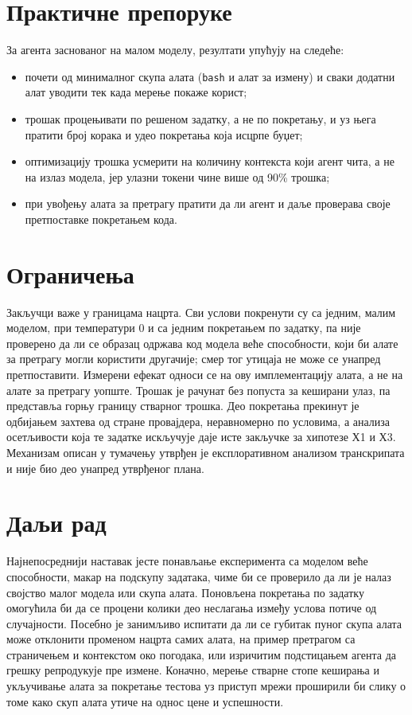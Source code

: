 \documentclass[12pt,a4paper]{report}
\begin{document}
	\section{Практичне препоруке}
	
	За агента заснованог на малом моделу, резултати упућују на следеће:
	\begin{itemize}
		\item почети од минималног скупа алата (\texttt{bash} и алат за измену) и
		сваки додатни алат уводити тек када мерење покаже корист;
		\item трошак процењивати по решеном задатку, а не по покретању, и уз њега
		пратити број корака и удео покретања која исцрпе буџет;
		\item оптимизацију трошка усмерити на количину контекста који агент чита,
		а не на излаз модела, јер улазни токени чине више од 90\% трошка;
		\item при увођењу алата за претрагу пратити да ли агент и даље проверава
		своје претпоставке покретањем кода.
	\end{itemize}
	
	\section{Ограничења}
	
	Закључци важе у границама нацрта. Сви услови покренути су са једним, малим
	моделом, при температури 0 и са једним покретањем по задатку, па није
	проверено да ли се образац одржава код модела веће способности, који би
	алате за претрагу могли користити другачије; смер тог утицаја не може се
	унапред претпоставити. Измерени ефекат односи се на ову имплементацију
	алата, а не на алате за претрагу уопште. Трошак је рачунат без попуста за
	кеширани улаз, па представља горњу границу стварног трошка. Део покретања
	прекинут је одбијањем захтева од стране провајдера, неравномерно по
	условима, а анализа осетљивости која те задатке искључује даје исте
	закључке за хипотезе Х1 и Х3. Механизам описан у тумачењу утврђен је
	експлоративном анализом транскрипата и није био део унапред утврђеног плана.
	
	\section{Даљи рад}
	
	Најнепосреднији наставак јесте понављање експеримента са моделом веће
	способности, макар на подскупу задатака, чиме би се проверило да ли је налаз
	својство малог модела или скупа алата. Поновљена покретања по задатку
	омогућила би да се процени колики део неслагања између услова потиче од
	случајности. Посебно је занимљиво испитати да ли се губитак пуног скупа
	алата може отклонити променом нацрта самих алата, на пример претрагом са
	страничењем и контекстом око погодака, или изричитим подстицањем агента да
	грешку репродукује пре измене. Коначно, мерење стварне стопе кеширања и
	укључивање алата за покретање тестова уз приступ мрежи проширили би слику о
	томе како скуп алата утиче на однос цене и успешности.
	
\end{document}
